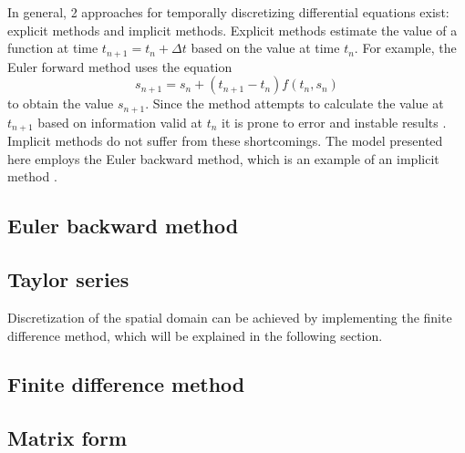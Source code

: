 In general, 2 approaches for temporally discretizing differential equations exist:  explicit methods and implicit methods.  Explicit methods estimate the value of a function at time $t_{n+1} = t_n + \Delta t$ based on the value at time $t_n$. For example, the Euler forward method uses the equation
\begin{equation}
  \label{eq:euformeth}
  s_{n+1} = s_n + (t_{n+1} - t_n) f(t_n,s_n)
\end{equation}
to obtain the value $s_{n+1}$.  Since the method attempts to calculate the value at $t_{n+1}$ based on information valid at $t_n$ it is prone to error and instable results \parencite{Weisstein2017a}.  Implicit methods do not suffer from these shortcomings.  The model presented here employs the Euler backward method, which is an example of an implicit method \parencite{Weisstein2017b}.

\subsection{Euler backward method}


\subsection{Taylor series}


Discretization of the spatial domain can be achieved by implementing the finite difference method, which will be explained in the following section.

\subsection{Finite difference method}


\subsection{Matrix form}




